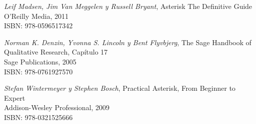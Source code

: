 


\begin{thebibliography}{9}

	 \textit{Leif Madsen, Jim Van Meggelen y Russell Bryant}, Asterisk The Definitive Guide \\ O'Reilly Media, 2011 \\ ISBN: 978-0596517342

	 \textit{Norman K. Denzin, Yvonna S. Lincoln y Bent Flyvbjerg}, The Sage Handbook of Qualitative Research, Capítulo 17 \\ Sage Publications, 2005 \\ ISBN: 978-0761927570
	
	 \textit{Stefan Wintermeyer y Stephen Bosch}, Practical Asterisk, From Beginner to Expert \\ Addison-Wesley Professional, 2009 \\ ISBN: 978-0321525666

\end{thebibliography}
